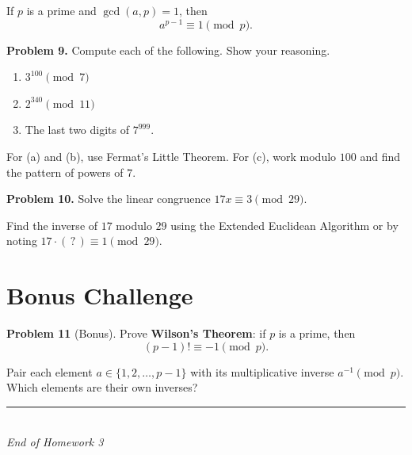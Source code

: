 \begin{defbox}
If $p$ is a prime and $\gcd(a, p) = 1$, then
\[
  a^{p-1} \equiv 1 \pmod{p}.
\]
\end{defbox}

\bigskip

\textbf{Problem 9.}\;
Compute each of the following.  Show your reasoning.
\begin{enumerate}[label=(\alph*), itemsep=4pt]
  \item $3^{100} \pmod{7}$
  \item $2^{340} \pmod{11}$
  \item The last two digits of $7^{999}$.
\end{enumerate}

\begin{hintbox}
For (a) and (b), use Fermat's Little Theorem.  For (c), work modulo $100$
and find the pattern of powers of $7$.
\end{hintbox}

\answerspace[2.5in]

\textbf{Problem 10.}\;
Solve the linear congruence $17x \equiv 3 \pmod{29}$.

\begin{hintbox}
Find the inverse of $17$ modulo $29$ using the Extended Euclidean Algorithm
or by noting $17 \cdot (\,?\,) \equiv 1 \pmod{29}$.
\end{hintbox}

\answerspace[2in]

\section*{Bonus Challenge}

\textbf{Problem 11} (Bonus).\;
Prove \textbf{Wilson's Theorem}: if $p$ is a prime, then
\[
  (p-1)! \equiv -1 \pmod{p}.
\]

\begin{hintbox}[Hint]
Pair each element $a \in \{1, 2, \ldots, p-1\}$ with its multiplicative
inverse $a^{-1} \pmod{p}$.  Which elements are their own inverses?
\end{hintbox}

\answerspace[2.8in]

\vfill
\begin{center}
  \rule{0.5\textwidth}{0.4pt}\\[4pt]
  \textit{\small End of Homework 3}
\end{center}


